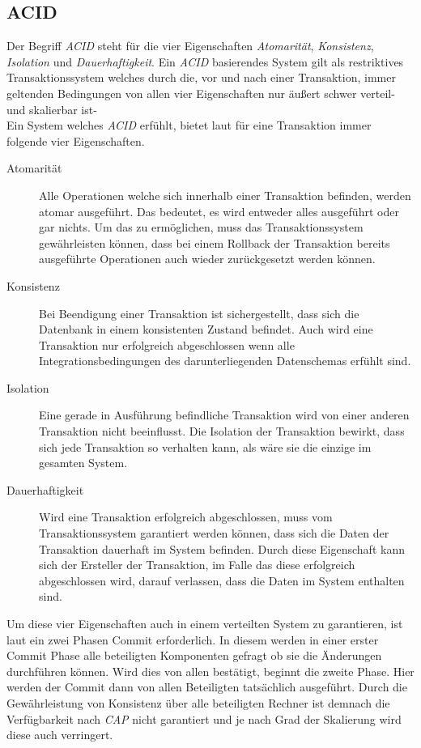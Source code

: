 \subsection{ACID}\label{sec:transactionTheory:acid}
Der Begriff \textit{ACID} steht für die vier Eigenschaften \textit{Atomarität}, \textit{Konsistenz}, \textit{Isolation} und \textit{Dauerhaftigkeit}. Ein \textit{ACID} basierendes System gilt als restriktives Transaktionssystem welches durch die, vor und nach einer Transaktion,  immer geltenden Bedingungen von allen vier Eigenschaften nur äußert schwer verteil- und skalierbar ist- \cite{PritchettBASE}\\
Ein System welches \textit{ACID} erfühlt, bietet laut \cite{haerder198Acid} für eine Transaktion immer folgende vier Eigenschaften.
% 
% 

\begin{description}
    \item[Atomarität] Alle Operationen welche sich innerhalb einer Transaktion befinden, werden atomar ausgeführt. Das bedeutet, es wird entweder alles ausgeführt oder gar nichts. Um das zu ermöglichen, muss das Transaktionssystem gewährleisten können, dass bei einem Rollback der Transaktion bereits ausgeführte Operationen auch wieder zurückgesetzt werden können. 
    \item[Konsistenz] Bei Beendigung einer Transaktion ist sichergestellt, dass sich die Datenbank in einem konsistenten Zustand befindet. Auch wird eine Transaktion nur erfolgreich abgeschlossen wenn alle Integrationsbedingungen des darunterliegenden Datenschemas erfühlt sind. 
    \item[Isolation] Eine gerade in Ausführung befindliche Transaktion wird von einer anderen Transaktion nicht beeinflusst. Die Isolation der Transaktion bewirkt, dass sich jede Transaktion so verhalten kann, als wäre sie die einzige im gesamten System.
    \item[Dauerhaftigkeit] Wird eine Transaktion erfolgreich abgeschlossen, muss vom Transaktionssystem garantiert werden können, dass sich die Daten der Transaktion dauerhaft im System befinden. Durch diese Eigenschaft kann sich der Ersteller der Transaktion, im Falle das diese erfolgreich abgeschlossen wird, darauf verlassen, dass die Daten im System enthalten sind.
\end{description}
Um diese vier Eigenschaften auch in einem verteilten System zu garantieren, ist laut \cite{PritchettBASE} ein zwei Phasen Commit erforderlich. In diesem werden in einer erster Commit Phase alle beteiligten Komponenten gefragt ob sie die Änderungen durchführen können. Wird dies von allen bestätigt, beginnt die zweite Phase. Hier werden der Commit dann von allen Beteiligten tatsächlich ausgeführt. Durch die Gewährleistung von Konsistenz über alle beteiligten Rechner ist demnach die Verfügbarkeit nach \textit{CAP} nicht garantiert und je nach Grad der Skalierung wird diese auch verringert.

